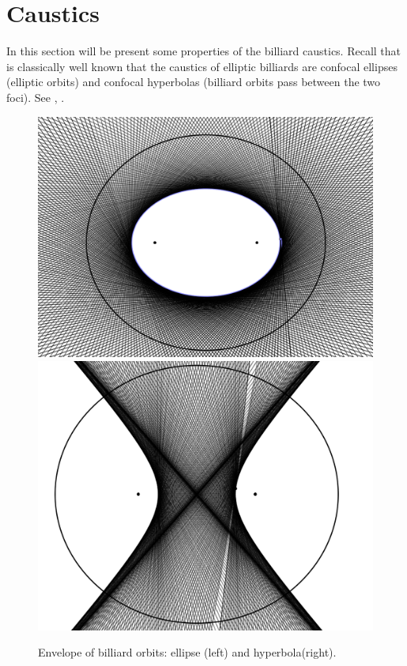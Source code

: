 
  
 
 \section{Caustics}
 \label{sec:appC-causticas}
 
  In this section will be present some properties of the billiard caustics.  Recall that is classically well known that the caustics of elliptic billiards are confocal ellipses (elliptic orbits) and confocal hyperbolas (billiard orbits pass between the two foci). See \cite[Chapter XI]{berger-2005}, \cite[Chapter 6]{hassel-2003}. 
  \begin{figure} 
	\begin{center}
	 \includegraphics[scale=0.3]{zappC/pics/pics_appC_120_caustica_EH.png}
	 	 \includegraphics[scale=0.3]{zappC/pics/pics_appC_130_caustica_HE.png}
		\caption {Envelope of billiard orbits: ellipse (left) and hyperbola(right). \label{fig:envelope}}
	\end{center}
\end{figure}
  
